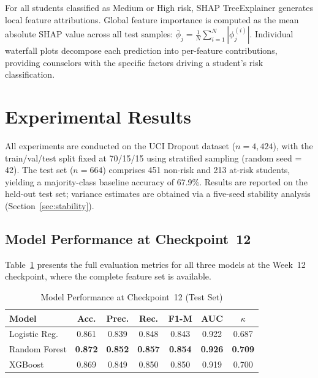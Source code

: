 \documentclass[conference,a4paper]{IEEEtran}
\begin{document}
For all students classified as Medium or High risk, SHAP TreeExplainer \cite{lundberg2017shap} generates local feature attributions. Global feature importance is computed as the mean absolute SHAP value across all test samples: $\bar{\phi}_j = \frac{1}{N}\sum_{i=1}^{N}|\phi_j^{(i)}|$. Individual waterfall plots decompose each prediction into per-feature contributions, providing counselors with the specific factors driving a student's risk classification.

\section{Experimental Results}\label{sec:results}

All experiments are conducted on the UCI Dropout dataset ($n = 4{,}424$), with the train/val/test split fixed at 70/15/15 using stratified sampling (random seed = 42). The test set ($n = 664$) comprises 451 non-risk and 213 at-risk students, yielding a majority-class baseline accuracy of 67.9\%. Results are reported on the held-out test set; variance estimates are obtained via a five-seed stability analysis (Section~\ref{sec:stability}).

\subsection{Model Performance at Checkpoint~12}

Table~\ref{tab:metrics} presents the full evaluation metrics for all three models at the Week~12 checkpoint, where the complete feature set is available.

\begin{table}[htbp]
\centering
\caption{Model Performance at Checkpoint~12 (Test Set)}
\label{tab:metrics}
\begin{tabular}{lcccccc}
\toprule
\textbf{Model} & \textbf{Acc.} & \textbf{Prec.} & \textbf{Rec.} & \textbf{F1-M} & \textbf{AUC} & \textbf{$\kappa$} \\
\midrule
Logistic Reg. & 0.861 & 0.839 & 0.848 & 0.843 & 0.922 & 0.687 \\
Random Forest & \textbf{0.872} & \textbf{0.852} & \textbf{0.857} & \textbf{0.854} & \textbf{0.926} & \textbf{0.709} \\
XGBoost       & 0.869 & 0.849 & 0.850 & 0.850 & 0.919 & 0.700 \\
\bottomrule
\end{tabular}
\end{table}
\end{document}
